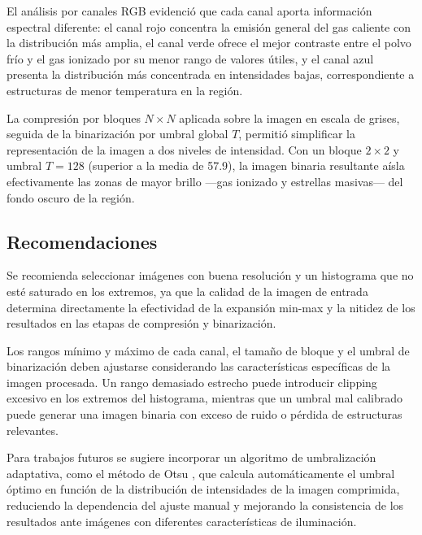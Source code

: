 \documentclass[11pt]{article}
\begin{document}
El análisis por canales RGB evidenció que cada canal aporta información espectral diferente: el canal rojo concentra la emisión general del gas caliente con la distribución más amplia, el canal verde ofrece el mejor contraste entre el polvo frío y el gas ionizado por su menor rango de valores útiles, y el canal azul presenta la distribución más concentrada en intensidades bajas, correspondiente a estructuras de menor temperatura en la región.

La compresión por bloques $N \times N$ aplicada sobre la imagen en escala de grises, seguida de la binarización por umbral global $T$, permitió simplificar la representación de la imagen a dos niveles de intensidad. Con un bloque $2\times2$ y umbral $T=128$ (superior a la media de 57.9), la imagen binaria resultante aísla efectivamente las zonas de mayor brillo —gas ionizado y estrellas masivas— del fondo oscuro de la región.

\subsection{Recomendaciones}

Se recomienda seleccionar imágenes con buena resolución y un histograma que no esté saturado en los extremos, ya que la calidad de la imagen de entrada determina directamente la efectividad de la expansión min-max y la nitidez de los resultados en las etapas de compresión y binarización.

Los rangos mínimo y máximo de cada canal, el tamaño de bloque y el umbral de binarización deben ajustarse considerando las características específicas de la imagen procesada. Un rango demasiado estrecho puede introducir clipping excesivo en los extremos del histograma, mientras que un umbral mal calibrado puede generar una imagen binaria con exceso de ruido o pérdida de estructuras relevantes.

Para trabajos futuros se sugiere incorporar un algoritmo de umbralización adaptativa, como el método de Otsu \cite{opencv_doc}, que calcula automáticamente el umbral óptimo en función de la distribución de intensidades de la imagen comprimida, reduciendo la dependencia del ajuste manual y mejorando la consistencia de los resultados ante imágenes con diferentes características de iluminación.
\end{document}

